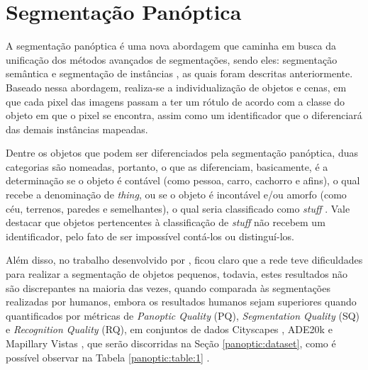 \newpage
\clearpage
\section{Segmentação Panóptica}
\label{panoptic:panoptic}
A segmentação panóptica \cite{Kirillov2019a} é uma nova abordagem que caminha em busca da unificação dos métodos avançados de segmentações, sendo eles: segmentação semântica e segmentação de instâncias \cite{He2020}, as quais foram descritas anteriormente. Baseado nessa abordagem, realiza-se a individualização de objetos e cenas, em que cada pixel das imagens passam a ter um rótulo de acordo com a classe do objeto em que o pixel se encontra, assim como um identificador que o diferenciará das demais instâncias mapeadas.

Dentre os objetos que podem ser diferenciados pela segmentação panóptica, duas categorias são nomeadas, portanto, o que as diferenciam, basicamente, é a determinação se o objeto é contável (como pessoa, carro, cachorro e afins), o qual  recebe a denominação de \textit{thing}, ou se o objeto é incontável e/ou amorfo (como céu, terrenos, paredes e semelhantes), o qual seria classificado como \textit{stuff} \cite{Kirillov2019a, Liu2019, Mohan2020}. Vale destacar que objetos pertencentes à classificação de \textit{stuff} não recebem um identificador, pelo fato de ser impossível contá-los ou distinguí-los.

Além disso, no trabalho desenvolvido por \cite{Kirillov2019a}, ficou claro que a rede teve dificuldades para realizar a segmentação de objetos pequenos, todavia, estes resultados não são discrepantes na maioria das vezes, quando comparada às segmentações realizadas por humanos, embora os resultados humanos sejam superiores quando quantificados por métricas de \textit{Panoptic Quality} (PQ), \textit{Segmentation Quality} (SQ) e \textit{Recognition Quality} (RQ), em conjuntos de dados Cityscapes \cite{Cordts2016}, ADE20k \cite{Zhou2016} e Mapillary Vistas \cite{Neuhold2017_ICCV}, que serão discorridas na Seção \ref{panoptic:dataset}, como é possível observar na Tabela \ref{panoptic:table:1} \cite{Kirillov2019a}.

